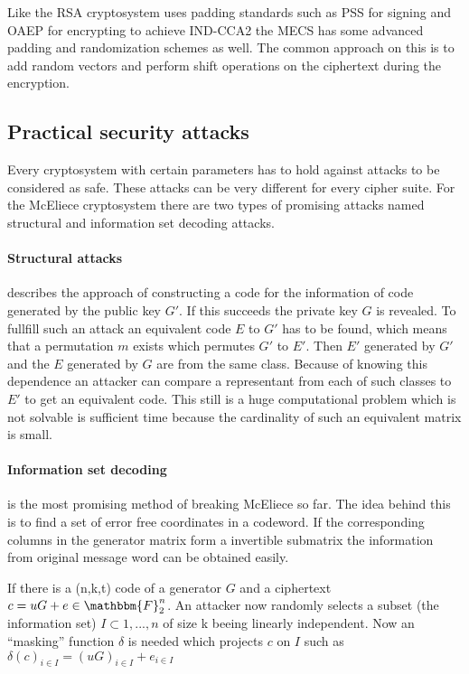 Like the RSA cryptosystem uses padding standards such as PSS for signing and OAEP for encrypting to achieve IND-CCA2 the MECS has some advanced padding and randomization schemes as well. The common approach on this is to add  random vectors and perform shift operations on the ciphertext during the encryption\cite{dottling2012cca2}. 

\subsection*{Practical security attacks}
\label{keylength}
Every cryptosystem with certain parameters has to hold against attacks to be considered as safe. These attacks can be very different for every cipher suite. 
For the McEliece cryptosystem there are two types of promising attacks named structural and information set decoding attacks. 
\paragraph*{Structural attacks} describes the approach of constructing a code for the information of code generated by the public key $G'$. If this succeeds the private key $G$ is revealed. 
To fullfill such an attack an equivalent code $E$ to $G'$ has to be found, which means that a permutation $m$ exists which permutes $G'$ to $E'$. Then $E'$ generated by $G'$ and the $E$ generated by $G$ are from the same class. 
Because of knowing this dependence an attacker can compare a representant from each of such classes to $E'$ to get an equivalent code. This still is a huge computational problem which is not solvable is sufficient time because the cardinality of such an equivalent matrix is small. \cite{au2003mceliece}


\paragraph*{Information set decoding} is the most promising method of breaking McEliece so far. The idea behind this is to find a set of error free coordinates in a codeword. If the corresponding columns in the generator matrix form a invertible submatrix the information from original message word can be obtained easily. 

 If there is a (n,k,t) code of a generator $G$ and a ciphertext $c = uG + e \in  \mathbbm{F}^n_2$. An attacker now randomly selects a subset (the information set) $I \subset 1, ..., n$ of size k beeing linearly independent. Now an ``masking'' function $\delta$ is needed which projects $c$ on $I$ such as $\delta(c)_{i \in I} = (uG)_{i\in I}+e_{i\in I}$
 
